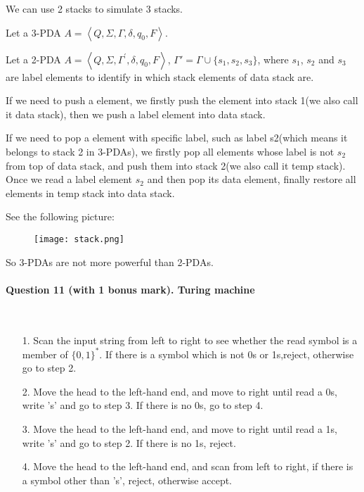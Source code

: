 \documentclass[12pt]{article}
\begin{document}
\begin{enumerate}
    We can use 2 stacks to simulate 3 stacks.\par
    Let a 3-PDA  $A = \left \langle Q, \Sigma, \Gamma, \delta, q_0, F \right \rangle$. \par
    Let a 2-PDA $A = \left \langle Q, \Sigma, \Gamma^{'}, \delta, q_0, F \right \rangle$, $\Gamma' = \Gamma \cup \{ s_1, s_2, s_3 \}$, where $s_1$, $s_2$ and $s_3$ are label elements to identify in which stack elements of data stack are. \par
    If we need to push a element, we firstly push the element into stack 1(we also call it data stack), then we push a label element into data stack. \par
    If we need to pop a element with specific label, such as label s2(which means it belongs to stack 2 in 3-PDAs), we firstly pop all elements whose label is not $s_2$ from top of data stack, and push them into stack 2(we also call it temp stack). Once we read a label element $s_2$ and then pop its data element, finally restore all elements in temp stack into data stack. \par
    See the following picture: \par
    \begin{figure}[htbp]
		\centering 
		\texttt{[image: stack.png]}
	\end{figure} \par
    So 3-PDAs are not more powerful than 2-PDAs.
\end{enumerate}
    
    \paragraph{Question 11 (with 1 bonus mark). Turing machine}~{}
    \\
    \begin{enumerate}
        \item [1.] Scan the input string from left to right to see whether the read symbol is a member of $\{0,1\}^*$. If there is a symbol which is not 0s or 1s,reject, otherwise go to step 2.
        \item [2.] Move the head to the left-hand end, and move to right until read a 0s, write 's' and go to step 3. If there is no 0s, go to step 4.
        \item [3.] Move the head to the left-hand end, and move to right until read a 1s, write 's' and go to step 2. If there is no 1s, reject.
        \item [4.] Move the head to the left-hand end, and scan from left to right, if there is a symbol other than 's', reject, otherwise accept.
    \end{enumerate}
\end{document}

